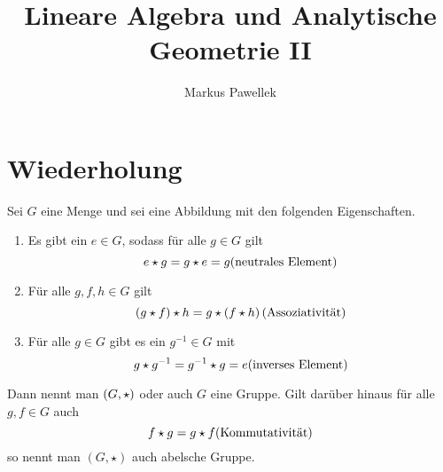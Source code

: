

\title{Lineare Algebra und Analytische Geometrie II}
\author{Markus Pawellek}

\ihead[]{\leftmark}
\ohead[]{\rightmark}
\cfoot[]{\newline\newline\newline\pagemark}



	\maketitle{\thispagestyle{empty}}
	\tableofcontents
	\newpage
	\pagestyle{empty}
	\listofmath
	\newpage
	\pagestyle{scrheadings}
	
	\section{Wiederholung} %
	\label{sec:wiederholung}
	
		\begin{definition}[Gruppe]
			Sei $G$ eine Menge und sei  eine Abbildung mit den folgenden Eigenschaften.
			\begin{enumerate}[label = \normalfont{(G\arabic*)}]
				\item Es gibt ein $e\in G$, sodass für alle $g\in G$ gilt
					\[
						e\star g = g\star e = g \hfill\text{(neutrales Element)}
					\] 
				\item Für alle $g,f,h \in G$ gilt
					\[
						\curvb{g\star f}\star h = g\star\curvb{f\star h} \hfill\text{(Assoziativität)}
					\]
				\item Für alle $g\in G$ gibt es ein $g^{-1}\in G$ mit
					\[
						g\star g^{-1} = g^{-1}\star g = e \hfill\text{(inverses Element)}
					\]
			\end{enumerate}
			Dann nennt man $\left( G,\star \right)$ oder auch $G$ eine Gruppe.
			Gilt darüber hinaus für alle $g,f\in G$ auch
			\[
				f\star g = g\star f \hfill\text{(Kommutativität)}
			\]
			so nennt man $(G,\star)$ auch abelsche Gruppe.
		\end{definition}

